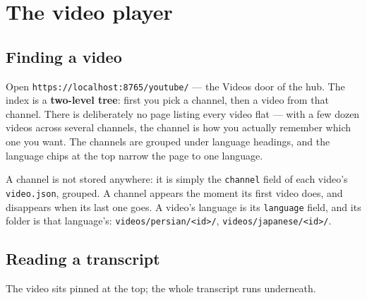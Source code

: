 \documentclass[11pt,oneside]{report}
\newcommand{\file}[1]{\texttt{#1}}
\begin{document}
\chapter{The video player}

\section{Finding a video}

Open \texttt{https://localhost:8765/youtube/} --- the Videos door of the
hub. The index is a \textbf{two-level tree}:
first you pick a channel, then a video from that channel. There is
deliberately no page listing every video flat --- with a few dozen videos
across several channels, the channel is how you actually remember which one
you want. The channels are grouped under language headings, and the
language chips at the top narrow the page to one language.

A channel is not stored anywhere: it is simply the \texttt{channel} field of
each video's \file{video.json}, grouped. A channel appears the moment its
first video does, and disappears when its last one goes. A video's language
is its \texttt{language} field, and its folder is that language's:
\file{videos/persian/<id>/}, \file{videos/japanese/<id>/}.

\section{Reading a transcript}

The video sits pinned at the top; the whole transcript runs underneath.
\end{document}
